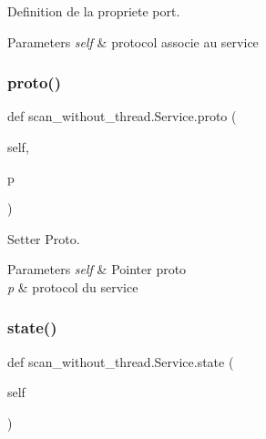 Definition de la propriete port. 


\begin{DoxyParams}{Parameters}
{\em self} & protocol associe au service \\
\hline
\end{DoxyParams}
\hypertarget{classscan__without__thread_1_1Service_a73d2dc616fc4689a0d6bfe6e21be9d28}{}\label{classscan__without__thread_1_1Service_a73d2dc616fc4689a0d6bfe6e21be9d28} 
\subsubsection{\texorpdfstring{proto()}{proto()}\hspace{0.1cm}{\footnotesize\ttfamily [2/2]}}
{\footnotesize\ttfamily def scan\+\_\+without\+\_\+thread.\+Service.\+proto (\begin{DoxyParamCaption}\item[{}]{self,  }\item[{}]{p }\end{DoxyParamCaption})}



Setter Proto. 


\begin{DoxyParams}{Parameters}
{\em self} & Pointer proto \\
\hline
{\em p} & protocol du service \\
\hline
\end{DoxyParams}
\hypertarget{classscan__without__thread_1_1Service_aea2d2fc597f04c681ac670402969d018}{}\label{classscan__without__thread_1_1Service_aea2d2fc597f04c681ac670402969d018} 
\subsubsection{\texorpdfstring{state()}{state()}\hspace{0.1cm}{\footnotesize\ttfamily [1/2]}}
{\footnotesize\ttfamily def scan\+\_\+without\+\_\+thread.\+Service.\+state (\begin{DoxyParamCaption}\item[{}]{self }\end{DoxyParamCaption})}



